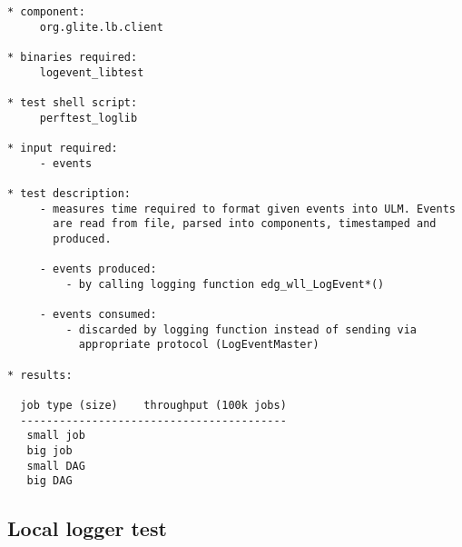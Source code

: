\begin{verbatim}
* component:
     org.glite.lb.client

* binaries required:
     logevent_libtest

* test shell script:
     perftest_loglib

* input required:
     - events

* test description:
     - measures time required to format given events into ULM. Events
       are read from file, parsed into components, timestamped and
       produced.

     - events produced:
         - by calling logging function edg_wll_LogEvent*()

     - events consumed:
         - discarded by logging function instead of sending via
           appropriate protocol (LogEventMaster)

* results:

  job type (size)    throughput (100k jobs)
  -----------------------------------------
   small job
   big job
   small DAG
   big DAG

\end{verbatim}


\subsection{Local logger test}

